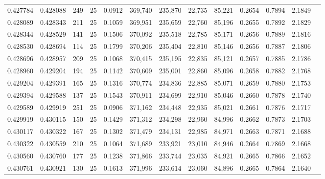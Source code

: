 \begin{tabular}{rrrrrrrrrrrrr}
0.427784 & 0.428088 &   249 &  25 &                                     0.0912 & 369,740 & 235,870 &  22,735 &  85,221 & 0.2654 & 0.7894 & 2.1849 \\
0.428089 & 0.428343 &   211 &  25 &                                     0.1059 & 369,951 & 235,659 &  22,760 &  85,196 & 0.2655 & 0.7892 & 2.1829 \\
0.428344 & 0.428529 &   141 &  25 &                                     0.1506 & 370,092 & 235,518 &  22,785 &  85,171 & 0.2656 & 0.7889 & 2.1816 \\
0.428530 & 0.428694 &   114 &  25 &                                     0.1799 & 370,206 & 235,404 &  22,810 &  85,146 & 0.2656 & 0.7887 & 2.1806 \\
0.428696 & 0.428957 &   209 &  25 &                                     0.1068 & 370,415 & 235,195 &  22,835 &  85,121 & 0.2657 & 0.7885 & 2.1786 \\
0.428960 & 0.429204 &   194 &  25 &                                     0.1142 & 370,609 & 235,001 &  22,860 &  85,096 & 0.2658 & 0.7882 & 2.1768 \\
0.429204 & 0.429391 &   165 &  25 &                                     0.1316 & 370,774 & 234,836 &  22,885 &  85,071 & 0.2659 & 0.7880 & 2.1753 \\
0.429394 & 0.429588 &   137 &  25 &                                     0.1543 & 370,911 & 234,699 &  22,910 &  85,046 & 0.2660 & 0.7878 & 2.1740 \\
0.429589 & 0.429919 &   251 &  25 &                                     0.0906 & 371,162 & 234,448 &  22,935 &  85,021 & 0.2661 & 0.7876 & 2.1717 \\
0.429919 & 0.430115 &   150 &  25 &                                     0.1429 & 371,312 & 234,298 &  22,960 &  84,996 & 0.2662 & 0.7873 & 2.1703 \\
0.430117 & 0.430322 &   167 &  25 &                                     0.1302 & 371,479 & 234,131 &  22,985 &  84,971 & 0.2663 & 0.7871 & 2.1688 \\
0.430322 & 0.430559 &   210 &  25 &                                     0.1064 & 371,689 & 233,921 &  23,010 &  84,946 & 0.2664 & 0.7869 & 2.1668 \\
0.430560 & 0.430760 &   177 &  25 &                                     0.1238 & 371,866 & 233,744 &  23,035 &  84,921 & 0.2665 & 0.7866 & 2.1652 \\
0.430761 & 0.430921 &   130 &  25 &                                     0.1613 & 371,996 & 233,614 &  23,060 &  84,896 & 0.2665 & 0.7864 & 2.1640 \\

\end{tabular}
